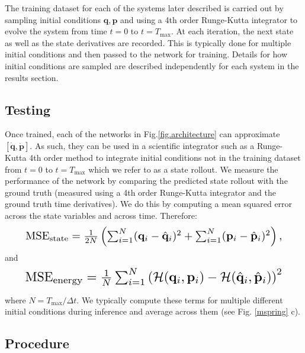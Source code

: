 \documentclass{article}
\begin{document}
The training dataset for each of the systems later described is carried out by sampling initial conditions $\mathbf{q},\mathbf{p}$ and using a 4th order Runge-Kutta integrator to evolve the system from time $t=0$ to $t=T_{\max}$. At each iteration, the next state as well as the state derivatives are recorded. This is typically done for multiple initial conditions and then passed to the network for training. Details for how initial conditions are sampled are described independently for each system in the results section.

\subsection{Testing}
Once trained, each of the networks in Fig.\ref{fig.architecture} can approximate $[\dot{\mathbf{q}},\dot{\mathbf{p}}]$. As such, they can be used in a scientific integrator such as a Runge-Kutta 4th order method to integrate initial conditions not in the training dataset from $t=0$ to $t=T_{\max}$ which we refer to as a state rollout. We measure the performance of the network by comparing the predicted state rollout with the ground truth (measured using a 4th order Runge-Kutta integrator and the ground truth time derivatives). We do this by computing a mean squared error across the state variables and across time. Therefore:
\begin{equation}
\resizebox{0.9\linewidth}{!}{$%
\mathrm{MSE}_{\mathrm{state}} = \frac{1}{2N} \left(\sum_{i=1}^N (\mathbf{q}_i-\hat{\mathbf{q}}_i)^2 + \sum_{i=1}^N (\mathbf{p}_i - \hat{\mathbf{p}}_i)^2\right),$}%
\end{equation}
and
\begin{equation}
\resizebox{0.9\linewidth}{!}{$%
\mathrm{MSE}_{\mathrm{energy}} = \frac{1}{N} \sum_{i=1}^N \left(\mathcal{H}(\mathbf{q}_i,\mathbf{p}_i)-\mathcal{H}(\hat{\mathbf{q}}_i,\hat{\mathbf{p}}_i)\right)^2$}%
\end{equation}

where $N = T_{\max}/\Delta t $. We typically compute these terms for multiple different initial conditions during inference and average across them (see Fig. \ref{mspring} c).



\subsection{Procedure}
\end{document}

